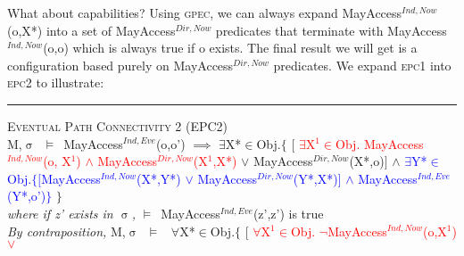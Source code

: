 \documentclass[a4paper,11pt, twoside,twocolumn]{article}
\newenvironment{logic}[1][]
{\begin{flushleft} \small }
{\end{flushleft}}
\newcommand{\loin}{$\in$}
\newcommand{\loforall}{$\forall$}
\newcommand{\loexists}{$\exists$}
\newcommand{\loand}{$\land$}
\newcommand{\loor} {$\lor$}
\newcommand{\loimplies}{$\implies$}
\newcommand{\losigma}{$\upsigma$}
\newcommand{\loturns} {$\vDash$}
\newcommand{\loneg}{$\boldsymbol \neg$}
\newcommand{\ablock} {\null\qquad}
\begin{document}
What about capabilities? Using \textsc{gpec}, we can always expand MayAccess$^{Ind, Now}$(o,X*) into a set of MayAccess$^{Dir, Now}$ predicates that terminate with MayAccess$^{Ind, Now}$(o,o) which is always true if o exists. The final result we will get is a configuration based purely on MayAccess$^{Dir, Now}$ predicates. We expand \textsc{epc1} into \textsc{epc2} to illustrate:

\begin{logic}
\hrule\null
\textsc{\normalsize *Eventual Path Connectivity 2 (EPC2)}\\
M,\losigma\ \loturns\ MayAccess$^{Ind,Eve}$(o,o')\linebreak
\ablock \loimplies\linebreak
\ablock \loexists X*\loin Obj.$\{$\linebreak
\ablock \ablock $[$\null
\textcolor{red}{\loexists X$^1$\loin{Obj}. MayAccess$^{Ind,Now}$(o, X$^1$) \loand\linebreak
\ablock \ablock \ablock \ablock \quad MayAccess$^{Dir,Now}$(X$^1$,X*)\linebreak
}
\ablock \ablock \quad \loor \linebreak
\ablock \ablock MayAccess$^{Dir,Now}$(X*,o)$ ]$\linebreak
\ablock \ablock \loand \linebreak
\textcolor{blue}{
\ablock \ablock \loexists Y*\loin Obj.$\{[$MayAccess$^{Ind,Now}$(X*,Y*)\linebreak
\ablock \ablock \ablock \ablock \quad \quad \loor \linebreak
\ablock \ablock \ablock \ablock \quad MayAccess$^{Dir,Now}$(Y*,X*)$]$\linebreak
\ablock \ablock \ablock \ablock \quad \loand \linebreak
\ablock \ablock \ablock \ablock \quad MayAccess$^{Ind,Eve}$(Y*,o')$\}$
}\linebreak
\ablock \ablock $\}$
\\
\ablock \textit{where if z' exists in \losigma,} \linebreak
\ablock \loturns\ MayAccess$^{Ind,Eve}$(z',z') is true \linebreak
\\
\textit{By contraposition,}\linebreak
M,\losigma\ \loturns\ \linebreak
\ablock \loforall X*\loin Obj.$\{$\linebreak
\ablock \quad $[$\null
\textcolor{red}{\loforall X$^1$\loin{Obj}. \loneg MayAccess$^{Ind,Now}$(o,X$^1$) \loor\linebreak
}
\end{logic}
\end{document}
